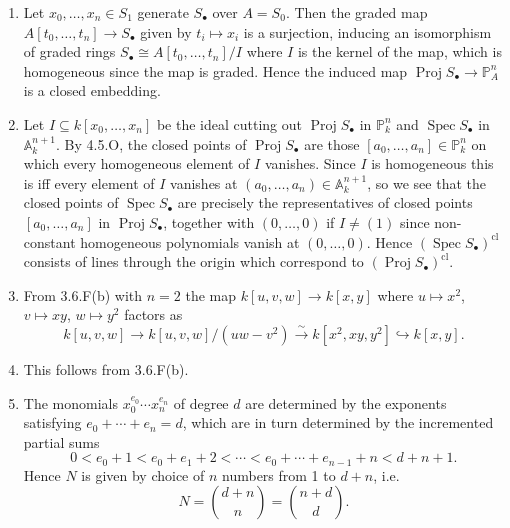\documentclass{report}
\newcommand{\cl}{{\mathrm{cl}}} %
\newcommand{\A}{\mathbb{A}}
\renewcommand{\P}{\mathbb{P}} %
\DeclareMathOperator{\Spec}{Spec}
\DeclareMathOperator{\Proj}{Proj}
\begin{document}
\begin{enumerate}[label=\textbf{8.2.\Alph*.}]
	\item Let $x_0,\ldots,x_n\in S_1$ generate $S_\bullet$ over $A=S_0$. Then
	      the graded map $A[t_0,\ldots,t_n]\to S_\bullet$ given by
	      $t_i\mapsto x_i$ is a surjection, inducing an isomorphism of graded
	      rings $S_\bullet\cong A[t_0,\ldots,t_n]/I$ where $I$ is the kernel of
	      the map, which is homogeneous since the map is graded. Hence the induced
	      map $\Proj S_\bullet\to\P^n_A$ is a closed embedding.

	\item Let $I\subseteq k[x_0,\ldots,x_n]$ be the ideal cutting out
	      $\Proj S_\bullet$ in $\P^n_k$ and $\Spec S_\bullet$ in $\A^{n+1}_k$. By
	      4.5.O, the closed points of $\Proj S_\bullet$ are those
	      $[a_0,\ldots,a_n]\in\P^n_k$ on which every homogeneous element of $I$
	      vanishes. Since $I$ is homogeneous this is iff every element of $I$
	      vanishes at $(a_0,\ldots,a_n)\in\A^{n+1}_k$, so we see that the closed
	      points of $\Spec S_\bullet$ are precisely the representatives of closed
	      points $[a_0,\ldots,a_n]$ in $\Proj S_\bullet$, together with
	      $(0,\ldots,0)$ if $I\ne(1)$ since non-constant homogeneous polynomials
	      vanish at $(0,\ldots,0)$. Hence $(\Spec S_\bullet)^\cl$ consists of
	      lines through the origin which correspond to $(\Proj S_\bullet)^\cl$.

	\item From 3.6.F(b) with $n=2$ the map $k[u,v,w]\to k[x,y]$ where
	      $u\mapsto x^2$, $v\mapsto xy$, $w\mapsto y^2$ factors as
	      \begin{equation*}
		      k[u,v,w]
		      \to k[u,v,w]/(uw-v^2)
		      \xrightarrow\sim k[x^2,xy,y^2]
		      \hookrightarrow k[x,y].
	      \end{equation*}

	\item This follows from 3.6.F(b).

	\item The monomials $x_0^{e_0}\cdots x_n^{e_n}$ of degree $d$ are determined
	      by the exponents satisfying $e_0+\cdots+e_n=d$, which are in turn
	      determined by the incremented partial sums
	      \begin{equation*}
		      0<e_0+1<e_0+e_1+2<\cdots<e_0+\cdots+e_{n-1}+n<d+n+1.
	      \end{equation*}
	      Hence $N$ is given by choice of $n$ numbers from 1 to $d+n$, i.e.
	      \begin{equation*}
		      N = \binom{d+n}{n} = \binom{n+d}{d}.
	      \end{equation*}


\end{enumerate}
\end{document}
